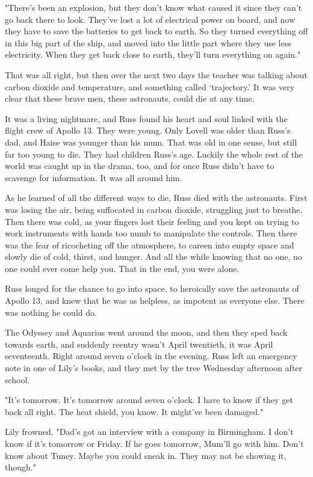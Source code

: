 "There's been an explosion, but they don't know what caused it since they can't go back there to look. They've lost a lot of electrical power on board, and now they have to save the batteries to get back to earth. So they turned everything off in this big part of the ship, and moved into the little part where they use less electricity. When they get back close to earth, they'll turn everything on again."

That was all right, but then over the next two days the teacher was talking about carbon dioxide and temperature, and something called `trajectory.' It was very clear that these brave men, these astronauts, could die at any time.

It was a living nightmare, and Russ found his heart and soul linked with the flight crew of Apollo 13. They were young. Only Lovell was older than Russ's dad, and Haise was younger than his mum. That was old in one sense, but still far too young to die. They had children Russ's age. Luckily the whole rest of the world was caught up in the drama, too, and for once Russ didn't have to scavenge for information. It was all around him.

As he learned of all the different ways to die, Russ died with the astronauts. First was losing the air, being suffocated in carbon dioxide, struggling just to breathe. Then there was cold, as your fingers lost their feeling and you kept on trying to work instruments with hands too numb to manipulate the controls. Then there was the fear of ricocheting off the atmosphere, to careen into empty space and slowly die of cold, thirst, and hunger. And all the while knowing that no one, no one could ever come help you. That in the end, you were alone.

Russ longed for the chance to go into space, to heroically save the astronauts of Apollo 13, and knew that he was as helpless, as impotent as everyone else. There was nothing he could do.

The Odyssey and Aquarius went around the moon, and then they sped back towards earth, and suddenly reentry wasn't April twentieth, it was April seventeenth. Right around seven o'clock in the evening. Russ left an emergency note in one of Lily's books, and they met by the tree Wednesday afternoon after school.

"It's tomorrow. It's tomorrow around seven o'clock. I have to know if they get back all right. The heat shield, you know. It might've been damaged."

Lily frowned. "Dad's got an interview with a company in Birmingham. I don't know if it's tomorrow or Friday. If he goes tomorrow, Mum'll go with him. Don't know about Tuney. Maybe you could sneak in. They may not be showing it, though."

